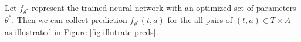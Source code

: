 Let $f_{\theta^*}$ represent the trained neural network with an optimized set of parameters $\theta^*$. 
Then we can collect prediction $f_{\theta^*}(t, a)$ for the all pairs of $(t,a) \in T \times A$ as illustrated in Figure \ref{fig:illutrate-preds}.







